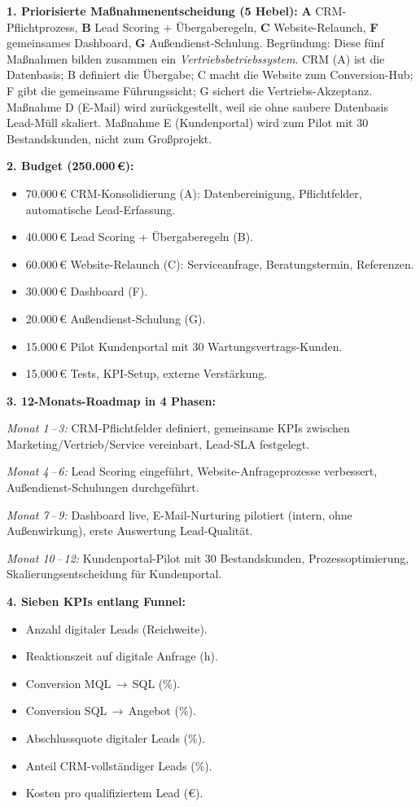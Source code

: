 \documentclass[11pt,a4paper,oneside]{article}
\begin{document}
\begin{loesungbox}
\textbf{1. Priorisierte Maßnahmenentscheidung (5 Hebel):}
\textbf{A} CRM-Pflichtprozess, \textbf{B} Lead Scoring + Übergaberegeln, \textbf{C} Website-Relaunch, \textbf{F} gemeinsames Dashboard, \textbf{G} Außendienst-Schulung. Begründung: Diese fünf Maßnahmen bilden zusammen ein \emph{Vertriebsbetriebssystem}. CRM (A) ist die Datenbasis; B definiert die Übergabe; C macht die Website zum Conversion-Hub; F gibt die gemeinsame Führungssicht; G sichert die Vertriebs-Akzeptanz. Maßnahme D (E-Mail) wird zurückgestellt, weil sie ohne saubere Datenbasis Lead-Müll skaliert. Maßnahme E (Kundenportal) wird zum Pilot mit 30 Bestandskunden, nicht zum Großprojekt.

\textbf{2. Budget (250.000\,\euro):}
\begin{itemize}
  \item 70.000\,\euro{} \textendash{} CRM-Konsolidierung (A): Datenbereinigung, Pflichtfelder, automatische Lead-Erfassung.
  \item 40.000\,\euro{} \textendash{} Lead Scoring + Übergaberegeln (B).
  \item 60.000\,\euro{} \textendash{} Website-Relaunch (C): Serviceanfrage, Beratungstermin, Referenzen.
  \item 30.000\,\euro{} \textendash{} Dashboard (F).
  \item 20.000\,\euro{} \textendash{} Außendienst-Schulung (G).
  \item 15.000\,\euro{} \textendash{} Pilot Kundenportal mit 30 Wartungsvertrags-Kunden.
  \item 15.000\,\euro{} \textendash{} Tests, KPI-Setup, externe Verstärkung.
\end{itemize}

\textbf{3. 12-Monats-Roadmap in 4 Phasen:}

\emph{Monat 1\,--\,3:} CRM-Pflichtfelder definiert, gemeinsame KPIs zwischen Marketing/Vertrieb/Service vereinbart, Lead-SLA festgelegt.

\emph{Monat 4\,--\,6:} Lead Scoring eingeführt, Website-Anfrageprozesse verbessert, Außendienst-Schulungen durchgeführt.

\emph{Monat 7\,--\,9:} Dashboard live, E-Mail-Nurturing pilotiert (intern, ohne Außenwirkung), erste Auswertung Lead-Qualität.

\emph{Monat 10\,--\,12:} Kundenportal-Pilot mit 30 Bestandskunden, Prozessoptimierung, Skalierungsentscheidung für Kundenportal.

\textbf{4. Sieben KPIs entlang Funnel:}
\begin{itemize}
  \item Anzahl digitaler Leads (Reichweite).
  \item Reaktionszeit auf digitale Anfrage (h).
  \item Conversion MQL\,$\rightarrow$\,SQL (\%).
  \item Conversion SQL\,$\rightarrow$\,Angebot (\%).
  \item Abschlussquote digitaler Leads (\%).
  \item Anteil CRM-vollständiger Leads (\%).
  \item Kosten pro qualifiziertem Lead (\euro).
\end{itemize}


\end{loesungbox}
\end{document}
